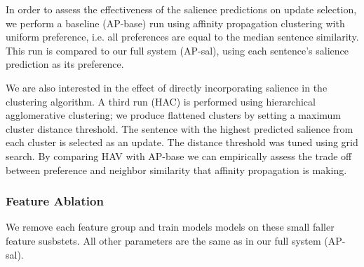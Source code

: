 In order to assess the effectiveness of the salience predictions on update
selection, we perform a baseline (AP-base) run using affinity propagation 
clustering
with uniform preference, i.e. all preferences are equal to the median sentence
similarity. This run is compared to our full system (AP-sal), using each
sentence's salience prediction as its preference. 

We are also interested
in the effect of directly incorporating salience in the clustering algorithm.
A third run (HAC) is performed using hierarchical agglomerative 
clustering; we produce flattened clusters by setting a maximum cluster 
distance threshold. The sentence with the highest predicted salience from each
 cluster is selected as an update. 
The distance threshold was tuned using grid search. By comparing
HAV with AP-base we can empirically assess the trade off between preference
and neighbor similarity that affinity propagation is making.

\subsubsection{Feature Ablation}

We remove each feature group and train models models on these small faller 
feature susbstets. All other parameters are the same as in our full system 
(AP-sal).



